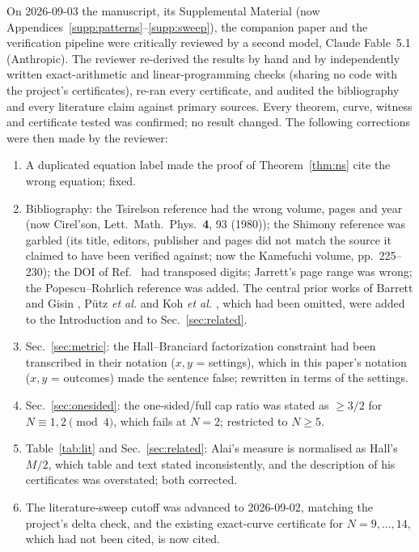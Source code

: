 \documentclass[aps,pra,reprint,superscriptaddress,floatfix]{revtex4-2}
\begin{document}
On 2026-09-03 the manuscript, its Supplemental Material (now Appendices~\ref{supp:patterns}--\ref{supp:sweep}), the companion
paper and the verification pipeline were critically reviewed by a second
model, Claude Fable~5.1 (Anthropic). The reviewer re-derived the results by
hand and by independently written exact-arithmetic and linear-programming
checks (sharing no code with the project's certificates), re-ran every
certificate, and audited the bibliography and every literature claim
against primary sources. Every theorem, curve, witness and certificate
tested was confirmed; no result changed. The following corrections were
then made by the reviewer:
\begin{enumerate}
\item A duplicated equation label made the proof of Theorem~\ref{thm:ns}
  cite the wrong equation; fixed.
\item Bibliography: the Tsirelson reference had the wrong volume, pages
  and year (now Cirel'son, Lett.\ Math.\ Phys.\ \textbf{4}, 93 (1980)); the
  Shimony reference was garbled (its title, editors, publisher and pages
  did not match the source it claimed to have been verified against; now
  the Kamefuchi volume, pp.~225--230); the DOI of
  Ref.~ had transposed digits; Jarrett's page range
  was wrong; the Popescu--Rohrlich reference was added. The central prior
  works of Barrett and Gisin \cite{barrettgisin2011}, P\"utz \emph{et al.}
  \cite{putz2014,putzgisin2016} and Koh \emph{et al.} \cite{koh2012}, which
  had been omitted, were added to the Introduction and to
  Sec.~\ref{sec:related}.
\item Sec.~\ref{sec:metric}: the Hall--Branciard factorization constraint
  had been transcribed in their notation ($x,y$ = settings), which in this
  paper's notation ($x,y$ = outcomes) made the sentence false; rewritten in
  terms of the settings.
\item Sec.~\ref{sec:onesided}: the one-sided/full cap ratio was stated as
  $\ge3/2$ for $N\equiv1,2\pmod 4$, which fails at $N=2$; restricted to
  $N\ge5$.
\item Table~\ref{tab:lit} and Sec.~\ref{sec:related}: Alai's measure is
  normalised as Hall's $M/2$, which table and text stated inconsistently,
  and the description of his certificates was overstated; both corrected.
\item The literature-sweep cutoff was advanced to 2026-09-02, matching the
  project's delta check, and the existing exact-curve certificate for
  $N=9,\dots,14$, which had not been cited, is now cited.

\end{enumerate}
\end{document}

